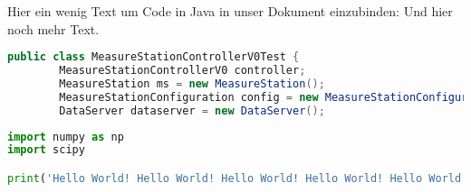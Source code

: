 \documentclass[12pt,a4paper]{scrartcl}
\begin{document}
%
Hier ein wenig Text um Code in Java in unser Dokument einzubinden: Und hier noch mehr Text.
\begin{lstlisting}[language=java]
public class MeasureStationControllerV0Test {   
        MeasureStationControllerV0 controller;  
        MeasureStation ms = new MeasureStation();   
        MeasureStationConfiguration config = new MeasureStationConfiguration();     
        DataServer dataserver = new DataServer();
\end{lstlisting}
\begin{lstlisting}[language=python]
import numpy as np
import scipy

print('Hello World! Hello World! Hello World! Hello World! Hello World! Hello World! Hello World!')
\end{lstlisting}
\end{document}
